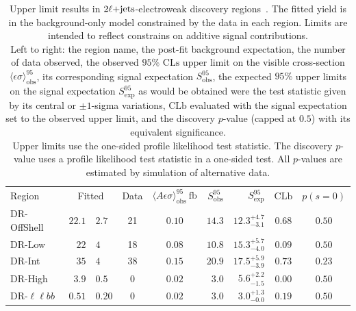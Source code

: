 \FloatBarrier
\begin{table}[tp]
\centering
\begin{tabular*}{\textwidth}{lr@{$~\pm~$}lccrrcc}
Region &
\multicolumn{2}{c}{Fitted} &
Data &
$\langle A\epsilon{ \sigma}\rangle_{\mathrm{obs}}^{95}~\mathrm{fb}$ &
$S_{\mathrm{obs}}^{95}$ &
$S_{\mathrm{exp}}^{95}$ &
$\mathrm{CLb}$ &
$p(s=0)$ \\[1.5ex]
DR-OffShell & $22.1$ & $2.7$ & 21 & $0.10$ & $14.3$ & $12.3^{+4.7}_{-3.1}$ & $0.68$ & $0.50$ \\[.5ex]
DR-Low & $22$ & $4$ & 18 & $0.08$ & $10.8$ & $15.3^{+5.7}_{-4.0}$ & $0.09$ & $0.50$ \\[.5ex]
DR-Int & $35$ & $4$ & 38 & $0.15$ & $20.9$ & $17.5^{+5.9}_{-3.9}$ & $0.73$ & $0.23$ \\[.5ex]
DR-High & $3.9$ & $0.5$ & 0 & $0.02$ & $3.0$ & $5.6^{+2.2}_{-1.5}$ & $0.00$ & $0.50$ \\[.5ex]
DR-$\ell\ell bb$ & $0.51$ & $0.20$ & 0 & $0.02$ & $3.0$ & $3.0^{+1.3}_{-0.0}$ & $0.19$ & $0.50$ \\[.5ex]
\end{tabular*}
\caption{%
Upper limit results in $2\ell\mathrm{+jets}$-electroweak discovery
regions~\cite{atlas2022searches}.
The fitted yield is in the background-only model constrained by the data in each region.
Limits are intended to reflect constrains on additive signal contributions.
\\[0.5em]
Left to right:
the region name,
the post-fit background expectation,
the number of data observed,
the observed $95\%$ $\mathrm{CLs}$ upper limit on the visible cross-section
$\langle\epsilon\sigma\rangle_\mathrm{obs}^{95}$,
its corresponding signal expectation $S_\mathrm{obs}^{95}$,
the expected $95\%$ upper limits on the signal expectation $S_\mathrm{exp}^{95}$
as would be obtained were the test statistic given by its central or
$\pm1$-sigma variations,
$\mathrm{CLb}$ evaluated with the signal expectation set to the observed upper limit,
and the discovery $p$-value (capped at $0.5$) with its equivalent significance.
\\[0.5em]
Upper limits use the one-sided profile likelihood test statistic.
The discovery $p$-value uses a profile likelihood test statistic in a one-sided test.
All $p$-values are estimated by simulation of alternative data.
}
\label{tab:2ljets_discovery}
\end{table}

